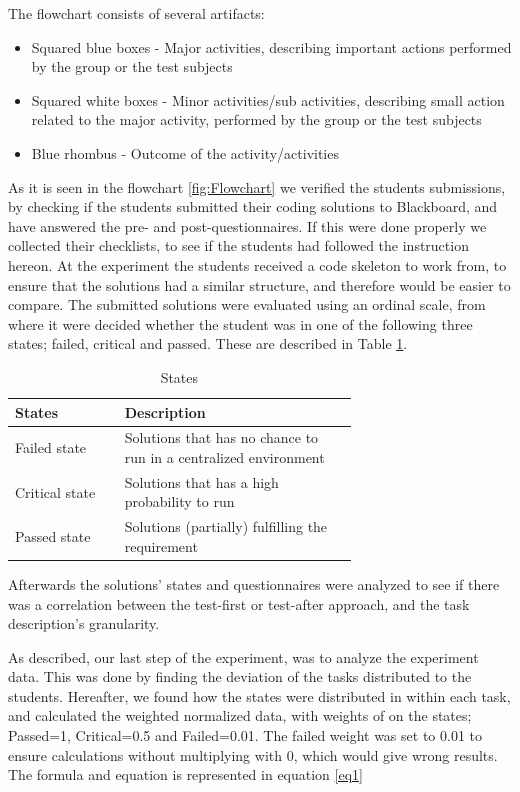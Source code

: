 \documentclass{sig-alternate-05-2015}
\begin{document}
The flowchart consists of several artifacts:
\begin{itemize}
\item Squared blue boxes - Major activities, describing important actions performed by the group or the test subjects
\item Squared white boxes - Minor activities/sub activities, describing small action related to the major activity, performed by the group or the test subjects
\item Blue rhombus - Outcome of the activity/activities
\end{itemize}

As it is seen in the flowchart \ref{fig:Flowchart} we verified the students submissions, by checking if the students submitted their coding solutions to Blackboard, and have answered the pre- and post-questionnaires. If this were done properly we collected their checklists, to see if the students had followed the instruction hereon.
At the experiment the students received a code skeleton to work from, to ensure that the solutions had a similar structure, and therefore would be easier to compare. The submitted solutions were evaluated using an ordinal scale, from where it were decided whether the student was in one of the following three states; failed, critical and passed. These are described in Table \ref{StatesTable}.

\begin{table}[!ht]
\centering
\caption{States}
\label{StatesTable}
\begin{tabular}{|l|p{0.68\linewidth}|}
\hline
\textbf{States} & \textbf{Description} \\
\hline
\hline
Failed state & Solutions that has no chance to run in a centralized environment \\
Critical state & Solutions that has a high probability to run \\
Passed state & Solutions (partially) fulfilling the requirement \\
\hline
\end{tabular}
\end{table}

Afterwards the solutions' states and questionnaires were analyzed to see if there was a correlation between the test-first or test-after approach, and the task description's granularity.

As described, our last step of the experiment, was to analyze the experiment data. This was done by finding the deviation of the tasks distributed to the students. Hereafter, we found how the states were distributed in within each task, and calculated the weighted normalized data, with weights of on the states; Passed=1, Critical=0.5 and Failed=0.01. The failed weight was set to 0.01 to ensure calculations without multiplying with 0, which would give wrong results.
The formula and equation is represented in equation \ref{eq1}
\end{document}
